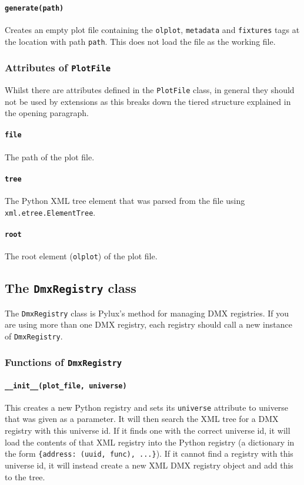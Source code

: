 \documentclass[a4paper]{article}
\begin{document}
\paragraph{\texttt{generate(path)}}
Creates an empty plot file containing the \texttt{olplot}, \texttt{metadata} 
and \texttt{fixtures} tags at the location with path \texttt{path}. This does 
not load the file as the working file.

\subsubsection{Attributes of \texttt{PlotFile}}
Whilst there are attributes defined in the \texttt{PlotFile} class, in 
general they should not be used by extensions as this breaks down the 
tiered structure explained in the opening paragraph.

\paragraph{\texttt{file}}
The path of the plot file.

\paragraph{\texttt{tree}}
The Python XML tree element that was parsed from the file using 
\texttt{xml.etree.ElementTree}.

\paragraph{\texttt{root}}
The root element (\texttt{olplot}) of the plot file.

\subsection{The \texttt{DmxRegistry} class}
The \texttt{DmxRegistry} class is Pylux's method for managing DMX registries. 
If you are using more than one DMX registry, each registry should call a new 
instance of \texttt{DmxRegistry}.

\subsubsection{Functions of \texttt{DmxRegistry}}

\paragraph{\texttt{\_\_init\_\_(plot\_file, universe)}}
This creates a new Python registry and sets its \texttt{universe} attribute 
to universe that was given as a parameter. It will then search the XML tree 
for a DMX registry with this universe id. If it finds one with the correct 
universe id, it will load the contents of that XML registry into the Python 
registry (a dictionary in the form \texttt{\{address: (uuid, func), ...\}}).
If it cannot find a registry with this universe id, it will instead create a 
new XML DMX registry object and add this to the tree.
\end{document}
